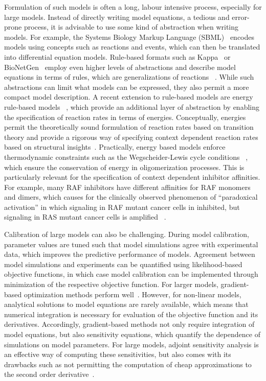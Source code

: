 \documentclass[11pt]{article}
\begin{document}
    Formulation of such models is often a long, labour intensive process,
especially for large models. Instead of directly writing model
equations, a tedious and error-prone process, it is advisable to use
some kind of abstraction when writing models. For example, the Systems
Biology Markup Language (SBML)~\cite{2754712/NF7FZULE} encodes models
using concepts such as reactions and events, which can then be
translated into differential equation models. Rule-based formats such as
Kappa~\cite{2754712/NAKF6985} or BioNetGen~\cite{2754712/M82A4YPP}
employ even higher levels of abstractions and describe model equations
in terms of rules, which are generalizations of reactions
~\cite{2754712/MIF24GAE}. While such abstractions can limit what models
can be expressed, they also permit a more compact model description. A
recent extension to rule-based models are energy rule-based models
~\cite{2754712/6CAKFQQP,2754712/QTNJGKHE}, which provide an
additional layer of abstraction by enabling the specification of
reaction rates in terms of energies. Conceptually, energies permit the
theoretically sound formulation of reaction rates based on transition
theory and provide a rigorous way of specifying context dependent
reaction rates based on structural insights~\cite{2754712/7TJH2IAK,2754712/DI7IDWLV}. Practically, energy based models enforce
thermodynamic constraints such as the Wegscheider-Lewis cycle conditions
~\cite{2754712/VAJ8A9TA}, which ensure the conservation of energy in
oligomerization processes. This is particularly relevant for the
specification of context dependent inhibitor affinities. For example,
many RAF inhibitors have different affinities for RAF monomers and
dimers, which causes for the clinically observed phenomenon of
``paradoxical activation'' in which signaling in RAF mutant cancer cells
in inhibited, but signaling in RAS mutant cancer cells is amplified
~\cite{2754712/68C3KR4X,2754712/GPZDY42G,2754712/46UNKAAD}.

    Calibration of large models can also be challenging. During model
calibration, parameter values are tuned such that model simulations
agree with experimental data, which improves the predictive performance
of models. Agreement between model simulations and experiments can be
quantified using likelihood-based objective functions, in which case
model calibration can be implemented through minimization of the
respective objective function. For larger models, gradient-based
optimization methods perform well~\cite{2754712/INKV577L}. However, for
non-linear models, analytical solutions to model equations are rarely
available, which means that numerical integration is necessary for
evaluation of the objective function and its derivatives. Accordingly,
gradient-based methods not only require integration of model equations,
but also sensitivity equations, which quantify the dependence of
simulations on model parameters. For large models, adjoint sensitivity
analysis is an effective way of computing these sensitivities, but also
comes with its drawbacks such as not permitting the computation of cheap
approximations to the second order derivative~\cite{2754712/MKPQ9727}.
\end{document}
